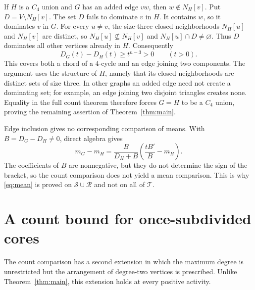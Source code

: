 \documentclass[11pt]{article}
\begin{document}
If $H$ is a $C_4$ union and $G$ has an added edge $vw$, then $w\notin N_H[v]$. Put $D=V\setminus N_H[v]$. The set $D$ fails to dominate $v$ in $H$. It contains $w$, so it dominates $v$ in $G$. For every $u\ne v$, the size-three closed neighborhoods $N_H[u]$ and $N_H[v]$ are distinct, so $N_H[u]\not\subseteq N_H[v]$ and $N_H[u]\cap D\ne\varnothing$. Thus $D$ dominates all other vertices already in $H$. Consequently
\[
 D_G(t)-D_H(t)\ge t^{n-3}>0\qquad(t>0).
\]
This covers both a chord of a $4$-cycle and an edge joining two components. The argument uses the structure of $H$, namely that its closed neighborhoods are distinct sets of size three. In other graphs an added edge need not create a dominating set; for example, an edge joining two disjoint triangles creates none. Equality in the full count theorem therefore forces $G=H$ to be a $C_4$ union, proving the remaining assertion of Theorem~\ref{thm:main}.

Edge inclusion gives no corresponding comparison of means. With $B=D_G-D_H\ne0$, direct algebra gives
\[
 m_G-m_H=\frac{B}{D_H+B}\left(\frac{tB'}B-m_H\right).
\]
The coefficients of $B$ are nonnegative, but they do not determine the sign of the bracket, so the count comparison does not yield a mean comparison. This is why \eqref{eq:mean} is proved on $\mathcal S\cup\mathcal R$ and not on all of $\mathcal T$. 

\section{A count bound for once-subdivided cores}\label{sec:subdivision}
The count comparison has a second extension in which the maximum degree is
unrestricted but the arrangement of degree-two vertices is prescribed. Unlike
Theorem~\ref{thm:main}, this extension holds at every positive activity.
\end{document}
